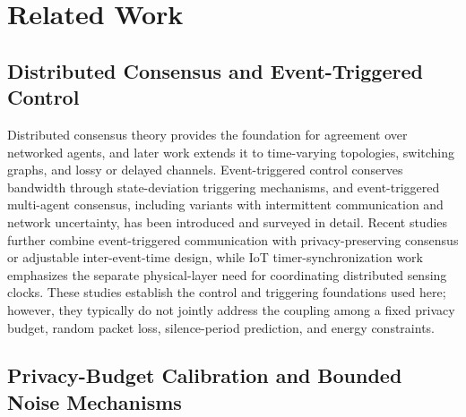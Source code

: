 \documentclass[10pt]{article}
\begin{document}

\section{Related Work}\label{sec:related}

\subsection{Distributed Consensus and Event-Triggered Control}

Distributed consensus theory\cite{olfati2007,jadbabaie2003} provides the foundation for agreement over networked agents, and later work extends it to time-varying topologies, switching graphs, and lossy or delayed channels. Event-triggered control conserves bandwidth through state-deviation triggering mechanisms\cite{tabuada2007,heemels2012}, and event-triggered multi-agent consensus, including variants with intermittent communication and network uncertainty, has been introduced and surveyed in detail\cite{heemels2012intro,nowzari2019}. Recent studies further combine event-triggered communication with privacy-preserving consensus or adjustable inter-event-time design\cite{liang2023edge_noise,wang2023moving_average}, while IoT timer-synchronization work emphasizes the separate physical-layer need for coordinating distributed sensing clocks\cite{zhou2026timer_sync}. These studies establish the control and triggering foundations used here; however, they typically do not jointly address the coupling among a fixed privacy budget, random packet loss, silence-period prediction, and energy constraints.

\subsection{Privacy-Budget Calibration and Bounded Noise Mechanisms}
\end{document}
